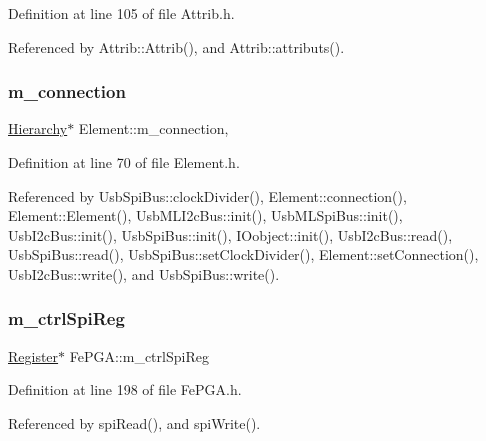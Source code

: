 Definition at line 105 of file Attrib.\+h.



Referenced by Attrib\+::\+Attrib(), and Attrib\+::attributs().

\mbox{\label{classElement_abe3de7a5dbbc9a6dd2d7e012e5fdb266}} 
\subsubsection{\texorpdfstring{m\+\_\+connection}{m\_connection}}
{\footnotesize\ttfamily \hyperlink{classHierarchy}{Hierarchy}$\ast$ Element\+::m\+\_\+connection\hspace{0.3cm}{\ttfamily [protected]}, {\ttfamily [inherited]}}



Definition at line 70 of file Element.\+h.



Referenced by Usb\+Spi\+Bus\+::clock\+Divider(), Element\+::connection(), Element\+::\+Element(), Usb\+M\+L\+I2c\+Bus\+::init(), Usb\+M\+L\+Spi\+Bus\+::init(), Usb\+I2c\+Bus\+::init(), Usb\+Spi\+Bus\+::init(), I\+Oobject\+::init(), Usb\+I2c\+Bus\+::read(), Usb\+Spi\+Bus\+::read(), Usb\+Spi\+Bus\+::set\+Clock\+Divider(), Element\+::set\+Connection(), Usb\+I2c\+Bus\+::write(), and Usb\+Spi\+Bus\+::write().

\mbox{\label{classFePGA_a8fb76733a688dff6d91892a49a97a21f}} 
\subsubsection{\texorpdfstring{m\+\_\+ctrl\+Spi\+Reg}{m\_ctrlSpiReg}}
{\footnotesize\ttfamily \hyperlink{classRegister}{Register}$\ast$ Fe\+P\+G\+A\+::m\+\_\+ctrl\+Spi\+Reg\hspace{0.3cm}{\ttfamily [private]}}



Definition at line 198 of file Fe\+P\+G\+A.\+h.



Referenced by spi\+Read(), and spi\+Write().

\mbox{\label{classFePGA_af911fcb4fc76acd553e9a492174f134b}} 
